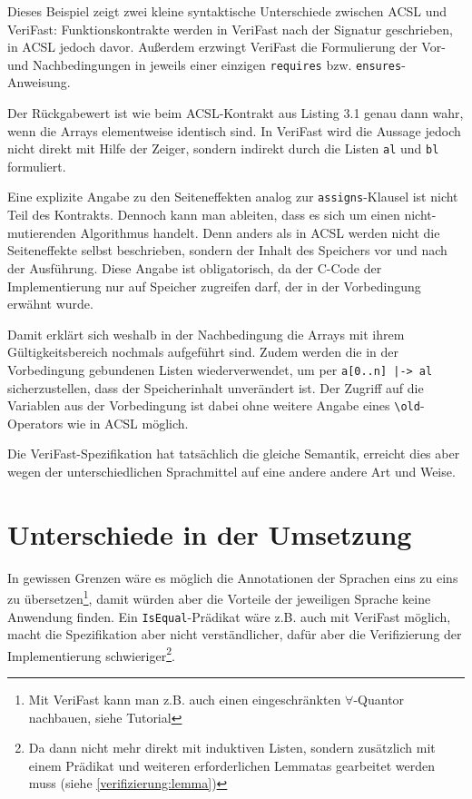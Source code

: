 Dieses Beispiel zeigt zwei kleine syntaktische Unterschiede zwischen ACSL und VeriFast: Funktionskontrakte
werden in VeriFast nach der Signatur geschrieben, in ACSL jedoch davor. Außerdem erzwingt VeriFast die
Formulierung der Vor- und Nachbedingungen in jeweils einer einzigen \lstinline{requires} bzw. \lstinline{ensures}-Anweisung.

Der Rückgabewert ist wie beim ACSL-Kontrakt aus Listing 3.1 genau dann wahr, wenn die Arrays elementweise
identisch sind. In VeriFast wird die Aussage jedoch nicht direkt mit Hilfe der Zeiger, sondern indirekt durch die
Listen \lstinline{al} und \lstinline{bl} formuliert.

Eine explizite Angabe zu den Seiteneffekten analog zur \lstinline{assigns}-Klausel ist nicht Teil des Kontrakts. 
Dennoch kann man ableiten, dass es sich um einen nicht-mutierenden Algorithmus handelt. Denn anders als in ACSL
werden nicht die Seiteneffekte selbst beschrieben, sondern der Inhalt des Speichers vor und nach der Ausführung.
Diese Angabe ist obligatorisch, da der C-Code der Implementierung nur auf Speicher zugreifen darf, der in der
Vorbedingung erwähnt wurde.

Damit erklärt sich weshalb in der Nachbedingung die Arrays mit ihrem Gültigkeitsbereich nochmals aufgeführt sind.
Zudem werden die in der Vorbedingung gebundenen Listen wiederverwendet, um per \lstinline{a[0..n] |-> al}
sicherzustellen, dass der Speicherinhalt unverändert ist. Der Zugriff auf die Variablen aus der Vorbedingung ist
dabei ohne weitere Angabe eines \lstinline{\old}-Operators wie in ACSL möglich.

Die VeriFast-Spezifikation hat tatsächlich die gleiche Semantik, erreicht dies aber wegen der 
unterschiedlichen Sprachmittel auf eine andere andere Art und Weise.


\section{Unterschiede in der Umsetzung}

In gewissen Grenzen wäre es möglich die Annotationen der Sprachen eins zu eins zu übersetzen\footnote{Mit
VeriFast kann man z.B. auch einen eingeschränkten \(\forall\)-Quantor nachbauen, siehe Tutorial\cite[Kap. 17]{jacobs-tutorial}},
damit würden aber die Vorteile der jeweiligen Sprache keine Anwendung finden. Ein \lstinline{IsEqual}-Prädikat wäre z.B.
auch mit VeriFast möglich, macht die Spezifikation aber nicht verständlicher, dafür aber die Verifizierung
der Implementierung schwieriger\footnote{Da dann nicht mehr direkt mit induktiven Listen, sondern zusätzlich
mit einem Prädikat und weiteren erforderlichen Lemmatas gearbeitet werden muss (siehe \ref{verifizierung:lemma})}.

